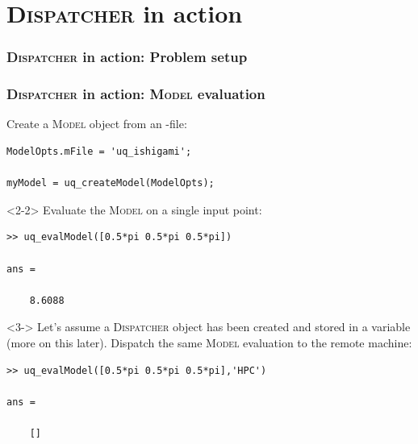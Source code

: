 \documentclass[]{rsuqbeamernew}
\begin{document}
\section{\textsc{Dispatcher} in action}

\begin{frame}[fragile]
\frametitle<1>{\textsc{Dispatcher} in action: Problem setup}
\frametitle<2->{\textsc{Dispatcher} in action: \textsc{Model} evaluation}

Create a \textsc{Model} object from an -file:
\begin{lstlisting}[basicstyle=\scriptsize]
ModelOpts.mFile = 'uq_ishigami';

myModel = uq_createModel(ModelOpts);
\end{lstlisting}

\begin{onlyenv}<2-2>
Evaluate the \textsc{Model} on a single input point:
\begin{lstlisting}[basicstyle=\scriptsize,numbers=none]
>> uq_evalModel([0.5*pi 0.5*pi 0.5*pi])

ans =
  
    8.6088
\end{lstlisting}
\end{onlyenv}

\begin{onlyenv}<3->
Let's assume a \textsc{Dispatcher} object has been created
and stored in a variable  ({\altx more on this later}).
Dispatch the same \textsc{Model} evaluation to the remote machine:
\begin{lstlisting}[basicstyle=\scriptsize,numbers=none]
>> uq_evalModel([0.5*pi 0.5*pi 0.5*pi],'HPC')
  
ans =
    
    []
\end{lstlisting}
\end{onlyenv}

  
\end{frame}
\end{document}
